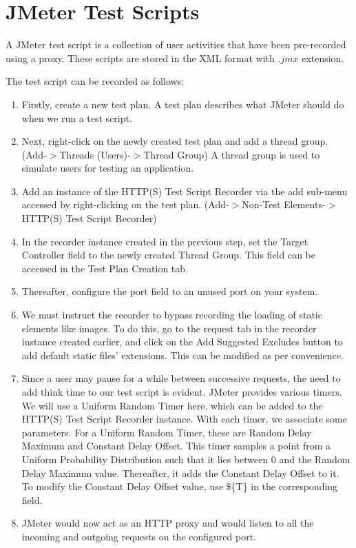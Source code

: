 \documentclass[12pt]{report}
\begin{document}
\section{JMeter Test Scripts}
A JMeter test script is a collection of user activities that have been pre-recorded using a proxy. These scripts are stored in the XML format with $.jmx$ extension.
\par
The test script can be recorded as follows:\cite{Performance}
\begin{enumerate}
	\item Firstly, create a new test plan. A test plan describes what JMeter should do when we run a test script. 
	\item Next, right-click on the newly created test plan and add a thread group. (Add-$>$Threads (Users)-$>$Thread Group) A thread group is used to simulate users for testing an application.
	\item Add an instance of the HTTP(S) Test Script Recorder via the add sub-menu accessed by right-clicking on the test plan. (Add-$>$Non-Test Elements-$>$HTTP(S) Test Script Recorder)
	\item In the recorder instance created in the previous step, set the Target Controller field to the newly created Thread Group. This field can be accessed in the Test Plan Creation tab.
	\item Thereafter, configure the port field to an unused port on your system.
	\item We must instruct the recorder to bypass recording the loading of static elements like images. To do this, go to the request tab in the recorder instance created earlier, and click on the Add Suggested Excludes button to add default static files' extensions. This can be modified as per convenience. 
	\item Since a user may pause for a while between successive requests, the need to add think time to our test script is evident. JMeter provides various timers. We will use a Uniform Random Timer here, which can be added to the HTTP(S) Test Script Recorder instance. With each timer, we associate some parameters. For a Uniform Random Timer, these are Random Delay Maximum and Constant Delay Offset. This timer samples a point from a Uniform Probability Distribution such that it lies between 0 and the Random Delay Maximum value. Thereafter, it adds the Constant Delay Offset to it. To modify the Constant Delay Offset value, use \$\{T\} in the corresponding field. 
	\item JMeter would now act as an HTTP proxy and would listen to all the incoming and outgoing requests on the configured port.

\end{enumerate}
\end{document}
